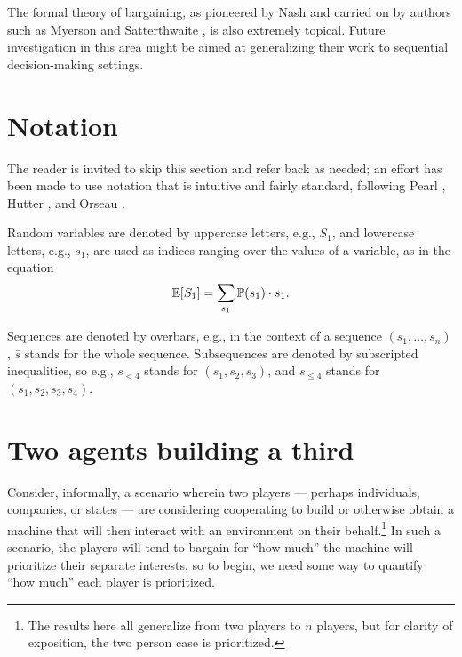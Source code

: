 \documentclass{article}  %
\newcommand{\seq}{\bar}
\begin{document}
The formal theory of bargaining, as pioneered by Nash \cite{Na50} and carried on by authors such as Myerson \cite{My79} \cite{My91} and Satterthwaite \cite{MS83}, is also extremely topical.  Future investigation in this area might be aimed at generalizing their work to sequential decision-making settings.

\section{Notation}
The reader is invited to skip this section and refer back as needed; an effort has been made to use notation that is intuitive and fairly standard, following Pearl \cite{Pe09}, Hutter \cite{Hu03}, and Orseau \cite{OR12}.

Random variables are denoted by uppercase letters, e.g., $S_1$, and lowercase letters, e.g., $s_1$, are used as indices ranging over the values of a variable, as in the equation
\[
\mathbb{E}[S_1] = \sum_{s_1} \mathbb{P}(s_1)\cdot s_1.
\]

Sequences are denoted by overbars, e.g., in the context of a sequence $(s_1,\ldots,s_n)$, $\seq s$ stands for the whole sequence.   Subsequences are denoted
by subscripted inequalities, so e.g., $s_{<4}$ stands for $(s_1,s_2,s_3)$,
and $s_{\le 4}$ stands for $(s_1,s_2,s_3,s_4)$.

\section{Two agents building a third}

Consider, informally, a scenario wherein two players --- perhaps individuals, companies, or states --- are considering cooperating to build or otherwise obtain a machine that will then interact with an environment on their behalf.\footnote{The results here all generalize from two players to $n$ players, but for clarity of exposition, the two person case is prioritized.} In such a scenario, the players will tend to bargain for ``how much'' the machine will prioritize their separate interests, so to begin, we need some way to quantify ``how much'' each player is prioritized.
\end{document}
